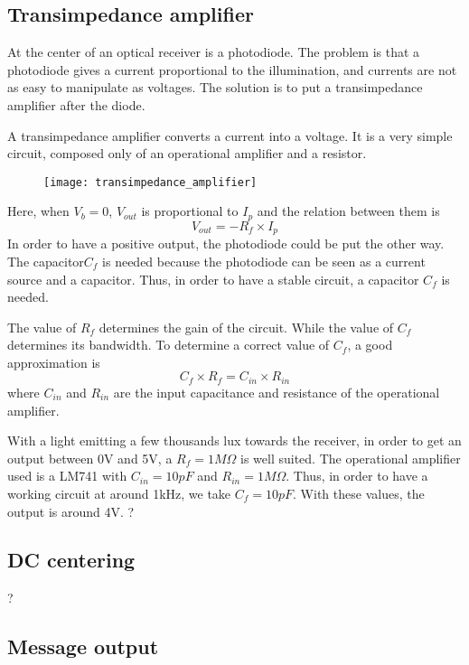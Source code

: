 \documentclass[12pt]{report}
\begin{document}
\subsection{Transimpedance amplifier}

At the center of an optical receiver is a photodiode. The problem is that a photodiode gives a current proportional to the illumination, and currents are not as easy to manipulate as voltages. The solution is to put a transimpedance amplifier after the diode.

A transimpedance amplifier converts a current into a voltage. It is a very simple circuit, composed only of an operational amplifier and a resistor.

\begin{figure}[h]
\centering
\texttt{[image: transimpedance\_amplifier]}
\end{figure}

Here, when $V_b = 0$, $V_{out}$ is proportional to $I_p$ and the relation between them is $$V_{out} = - R_f \times I_p$$
In order to have a positive output, the photodiode could be put the other way.
The capacitor$ C_f$ is needed because the photodiode can be seen as a current source and a capacitor. Thus, in order to have a stable circuit, a capacitor $C_f$ is needed.

The value of $R_f$ determines the gain of the circuit. While the value of $C_f$ determines its bandwidth. To determine a correct value of $C_f$, a good approximation is $$C_f \times R_f = C_{in} \times R_{in}$$ where $C_{in}$ and $R_{in}$ are the input capacitance and resistance of the operational amplifier.

With a light emitting a few thousands lux towards the receiver, in order to get an output between 0V and 5V, a $R_f = 1M\Omega$ is well suited.
 The operational amplifier used is a LM741 with $C_{in} = 10pF$ and $R_{in} = 1M\Omega$. Thus, in order to have a working circuit at around 1kHz, we take $C_f = 10pF$.
With these values, the output is around 4V. ?

\subsection{DC centering}

?

\subsection{Message output}
\end{document}
